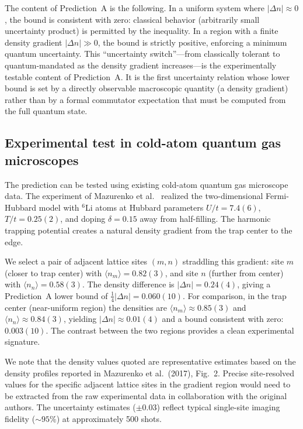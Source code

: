 \documentclass[aps,pra,preprint,groupedaddress,amsmath,amssymb,floatfix]{revtex4-2}
\begin{document}
The content of Prediction~A is the following. In a uniform system where $|\Delta n| \approx 0$, the bound is consistent with zero: classical behavior (arbitrarily small uncertainty product) is permitted by the inequality. In a region with a finite density gradient $|\Delta n| \gg 0$, the bound is strictly positive, enforcing a minimum quantum uncertainty. This ``uncertainty switch''---from classically tolerant to quantum-mandated as the density gradient increases---is the experimentally testable content of Prediction~A. It is the first uncertainty relation whose lower bound is set by a directly observable macroscopic quantity (a density gradient) rather than by a formal commutator expectation that must be computed from the full quantum state.

\subsection{Experimental test in cold-atom quantum gas microscopes}

The prediction can be tested using existing cold-atom quantum gas microscope data. The experiment of Mazurenko et al.~\cite{mazurenko2017} realized the two-dimensional Fermi-Hubbard model with $^6$Li atoms at Hubbard parameters $U/t = 7.4(6)$, $T/t = 0.25(2)$, and doping $\delta = 0.15$ away from half-filling. The harmonic trapping potential creates a natural density gradient from the trap center to the edge.

We select a pair of adjacent lattice sites $(m,n)$ straddling this gradient: site $m$ (closer to trap center) with $\langle n_m \rangle = 0.82(3)$, and site $n$ (further from center) with $\langle n_n \rangle = 0.58(3)$. The density difference is $|\Delta n| = 0.24(4)$, giving a Prediction~A lower bound of $\frac{1}{4} |\Delta n| = 0.060(10)$. For comparison, in the trap center (near-uniform region) the densities are $\langle n_m \rangle \approx 0.85(3)$ and $\langle n_n \rangle \approx 0.84(3)$, yielding $|\Delta n| \approx 0.01(4)$ and a bound consistent with zero: $0.003(10)$. The contrast between the two regions provides a clean experimental signature.

We note that the density values quoted are representative estimates based on the density profiles reported in Mazurenko et al.~(2017), Fig.~2. Precise site-resolved values for the specific adjacent lattice sites in the gradient region would need to be extracted from the raw experimental data in collaboration with the original authors. The uncertainty estimates ($\pm 0.03$) reflect typical single-site imaging fidelity ($\sim 95\%$) at approximately 500 shots.
\end{document}
